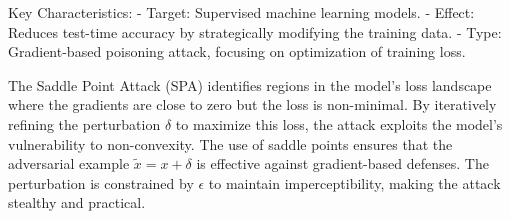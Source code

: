 Key Characteristics:
- Target: Supervised machine learning models.
- Effect: Reduces test-time accuracy by strategically modifying the training data.
- Type: Gradient-based poisoning attack, focusing on optimization of training loss.

The Saddle Point Attack (SPA) identifies regions in the model's loss landscape where the gradients are close to zero but the loss is non-minimal. By iteratively refining the perturbation \( \delta \) to maximize this loss, the attack exploits the model's vulnerability to non-convexity. The use of saddle points ensures that the adversarial example \( \tilde{x} = x + \delta \) is effective against gradient-based defenses. The perturbation is constrained by \( \epsilon \) to maintain imperceptibility, making the attack stealthy and practical.
